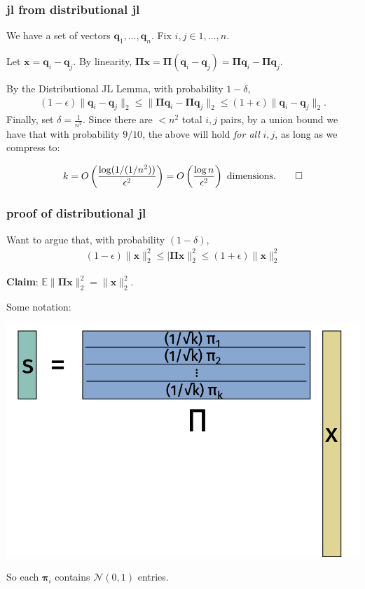 \documentclass[compress]{beamer}
\newcommand{\bs}[1]{\boldsymbol{#1}}
\newcommand{\bv}[1]{\mathbf{#1}}
\newcommand{\E}{\mathbb{E}}
\begin{document}
\begin{frame}
	\frametitle{jl from distributional jl}
	We have a set of vectors $\bv{q}_1, \ldots, \bv{q}_n$. Fix $i,j \in 1,\ldots, n$. 
	
	Let $\bv{x} = \bv{q}_i - \bv{q}_j$. By linearity, $\bs{\Pi}\bv{x} = \bs{\Pi}(\bv{q}_i - \bv{q}_j) = \bs{\Pi}\bv{q}_i - \bs{\Pi}\bv{q}_j$.
	
	By the Distributional JL Lemma, with probability $1-\delta$,
	\begin{align*}
		(1-\epsilon)\|\bv{q}_i - \bv{q}_j\|_2 \leq \|\bs{\Pi}\bv{q}_i - \bs{\Pi}\bv{q}_j\|_2 \leq (1+\epsilon) \|\bv{q}_i - \bv{q}_j\|_2.
	\end{align*}
	Finally, set $\delta = \frac{1}{n^2}$. Since there are $< n^2$ total $i,j$ pairs, by a union bound we have that with probability $9/10$, the above will hold \emph{for all} $i,j$, as long as we compress to:
	
	\begin{align*}
		k = O\left(\frac{\log(1/(1/n^2))}{\epsilon^2}\right) = O\left(\frac{\log n}{\epsilon^2}\right) \text{ dimensions.}\qed
	\end{align*}
	
\end{frame}

\begin{frame}
	\frametitle{proof of distributional jl}
	Want to argue that, with probability $(1-\delta)$,
	\begin{align*}
		(1-\epsilon)\|\bv{x}\|_2^2 \leq |\bs{\Pi}\bv{x}\|_2^2 \leq (1+\epsilon)\|\bv{x}\|_2^2 
	\end{align*}
	
	\begin{center}
		\alert{\textbf{Claim}: $\E \|\bs{\Pi} \bv{x} \|_2^2 = \|\bv{x}\|_2^2.$}
	\end{center}
	
	\vspace{-1em}
	Some notation:
	\begin{center}
		\includegraphics[width=.6\textwidth]{jl_notation.png}
		
		So each $\bs{\pi}_i$ contains $\mathcal{N}(0,1)$ entries. 
	\end{center}
\end{frame}
\end{document}
